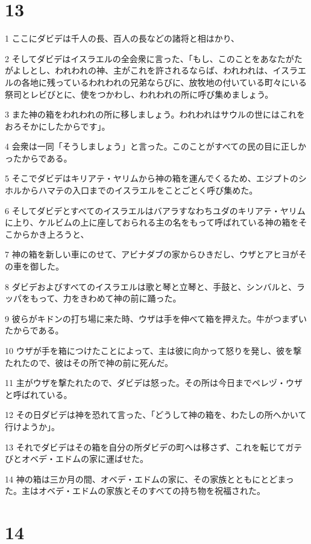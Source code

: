 \chapter{13}

\par 1 ここにダビデは千人の長、百人の長などの諸将と相はかり、
\par 2 そしてダビデはイスラエルの全会衆に言った、「もし、このことをあなたがたがよしとし、われわれの神、主がこれを許されるならば、われわれは、イスラエルの各地に残っているわれわれの兄弟ならびに、放牧地の付いている町々にいる祭司とレビびとに、使をつかわし、われわれの所に呼び集めましょう。
\par 3 また神の箱をわれわれの所に移しましょう。われわれはサウルの世にはこれをおろそかにしたからです」。
\par 4 会衆は一同「そうしましょう」と言った。このことがすべての民の目に正しかったからである。
\par 5 そこでダビデはキリアテ・ヤリムから神の箱を運んでくるため、エジプトのシホルからハマテの入口までのイスラエルをことごとく呼び集めた。
\par 6 そしてダビデとすべてのイスラエルはバアラすなわちユダのキリアテ・ヤリムに上り、ケルビムの上に座しておられる主の名をもって呼ばれている神の箱をそこからかき上ろうと、
\par 7 神の箱を新しい車にのせて、アビナダブの家からひきだし、ウザとアヒヨがその車を御した。
\par 8 ダビデおよびすべてのイスラエルは歌と琴と立琴と、手鼓と、シンバルと、ラッパをもって、力をきわめて神の前に踊った。
\par 9 彼らがキドンの打ち場に来た時、ウザは手を伸べて箱を押えた。牛がつまずいたからである。
\par 10 ウザが手を箱につけたことによって、主は彼に向かって怒りを発し、彼を撃たれたので、彼はその所で神の前に死んだ。
\par 11 主がウザを撃たれたので、ダビデは怒った。その所は今日までペレヅ・ウザと呼ばれている。
\par 12 その日ダビデは神を恐れて言った、「どうして神の箱を、わたしの所へかいて行けようか」。
\par 13 それでダビデはその箱を自分の所ダビデの町へは移さず、これを転じてガテびとオベデ・エドムの家に運ばせた。
\par 14 神の箱は三か月の間、オベデ・エドムの家に、その家族とともにとどまった。主はオベデ・エドムの家族とそのすべての持ち物を祝福された。

\chapter{14}

